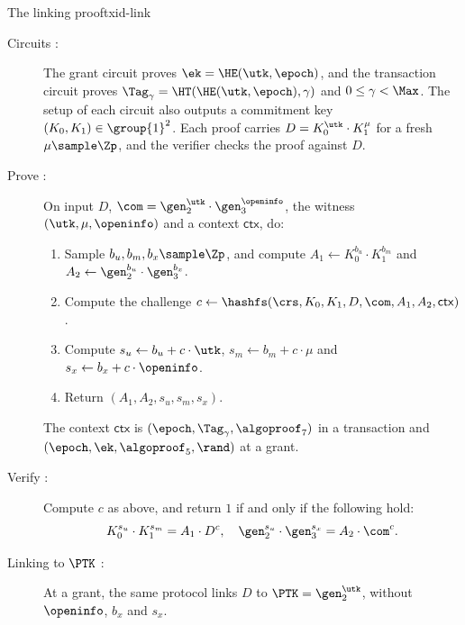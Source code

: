 \begin{protocolbox}{The linking proof}{txid-link}

  \begin{description}

    \item[Circuits :] The grant circuit proves $\ek = \HE(\utk, \epoch)$, and
the transaction circuit proves $\Tag_\gamma = \HT(\HE(\utk, \epoch), \gamma)$
and $0 \leq \gamma < \Max$. The setup of each circuit also outputs a
commitment key $(K_0, K_1) \in \group{1}^2$. Each proof carries $D =
K_0^{\utk}\cdot K_1^{\mu}$ for a fresh $\mu \sample \Zp$, and the verifier
checks the proof against $D$.

    \item[Prove :] On input $D$, $\com = \gen_2^{\utk}\cdot\gen_3^{\openinfo}$,
the witness $(\utk, \mu, \openinfo)$ and a context $\mathsf{ctx}$, do:

      \begin{enumerate}

	\item Sample $b_u, b_m, b_x \sample \Zp$, and compute $A_1 \leftarrow
K_0^{b_u}\cdot K_1^{b_m}$ and $A_2 \leftarrow \gen_2^{b_u}\cdot\gen_3^{b_x}$.

	\item Compute the challenge $c \leftarrow \hashfs(\crs, K_0, K_1, D,
\com, A_1, A_2, \mathsf{ctx})$.

	\item Compute $s_u \leftarrow b_u + c\cdot\utk$, $s_m \leftarrow b_m +
c\cdot\mu$ and $s_x \leftarrow b_x + c\cdot\openinfo$.

	\item Return $(A_1, A_2, s_u, s_m, s_x)$.

      \end{enumerate}

      The context $\mathsf{ctx}$ is $(\epoch, \Tag_\gamma, \algoproof_7)$ in a
transaction and $(\epoch, \ek, \algoproof_5, \rand)$ at a grant.

    \item[Verify :] Compute $c$ as above, and return $1$ if and only if the
following hold:
      \begin{equation*}
	K_0^{s_u}\cdot K_1^{s_m} = A_1\cdot D^c, \quad
\gen_2^{s_u}\cdot\gen_3^{s_x} = A_2\cdot\com^c.
      \end{equation*}

    \item[Linking to $\PTK$ :] At a grant, the same protocol links $D$ to $\PTK
= \gen_2^{\utk}$, without $\openinfo$, $b_x$ and $s_x$.

  \end{description}

\end{protocolbox}

